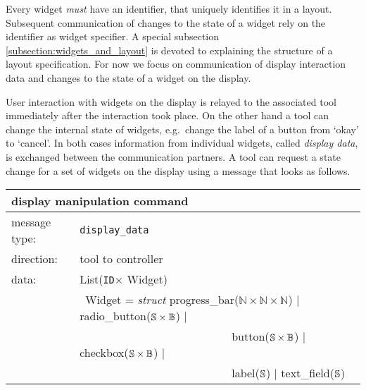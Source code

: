\documentclass{article}
\newcommand{\msg}[1]{\texttt{#1}}
\newcommand{\String}{\ensuremath \mathbb{S}\xspace}
\newcommand{\Id}{\texttt{ID}\xspace}
\begin{document}
   \noindent Every widget \emph{must} have an identifier, that uniquely
   identifies it in a layout.  Subsequent communication of changes to the state
   of a widget rely on the identifier as widget specifier. A special subsection
   \ref{subsection:widgets_and_layout} is devoted to explaining the structure
   of a layout specification. For now we focus on communication of display
   interaction data and changes to the state of a widget on the display.

   User interaction with widgets on the display is relayed to the
   associated tool immediately after the interaction took place. On the other
   hand a tool can change the internal state of widgets, e.g.\ change the label
   of a button from `okay' to `cancel'. In both cases information from
   individual widgets, called \textit{display data}, is exchanged between the
   communication partners. A tool can request a state change for a set of
   widgets on the display using a message that looks as follows.

   \begin{table}[H]
    \begin{center}
     \begin{tabular}{|ll|}
      \hline
       \multicolumn{2}{|l|}{\textbf{display manipulation command}} \\
      \hline
       message type:   & \msg{display\_data} \\
      \hline
       direction:      & tool to controller \\
      \hline
       data:           & List(\Id $\times$ Widget) \\
                       & \ Widget = \textit{struct} progress\_bar($\mathbb{N} \times \mathbb{N} \times \mathbb{N}$) $|$
                                                    radio\_button($\String \times \mathbb{B}$) $|$ \\
                       & \ \ \ \ \ \ \ \ \ \ \ \ \ \ \ \ \ \ \ \ \ \ \ \ \ \ \
                                                    button($\String \times \mathbb{B}$) $|$
                                                    checkbox($\String \times \mathbb{B}$) $|$ \\
                       & \ \ \ \ \ \ \ \ \ \ \ \ \ \ \ \ \ \ \ \ \ \ \ \ \ \ \
                                                    label($\String$) $|$
                                                    text\_field($\String$) \\
      \hline
     \end{tabular}
    \end{center}
   \vspace{-0.4cm}
   \end{table}
\end{document}
